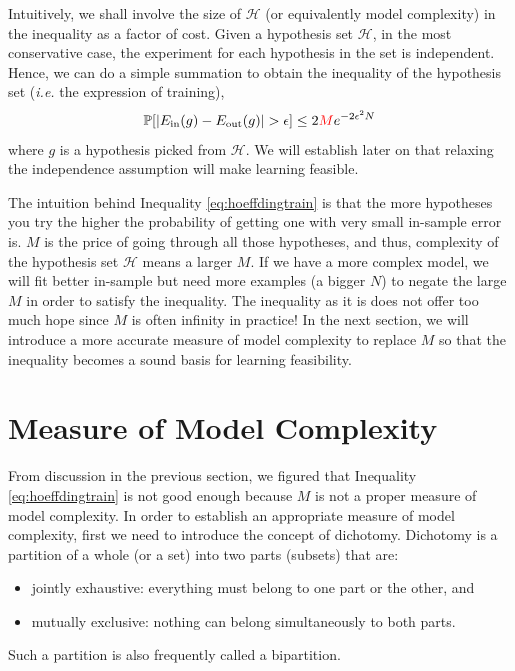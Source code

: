 \documentclass[10pt]{article}
\numberwithin{equation}{section}  %
\begin{document}
Intuitively, we shall involve the size of $\mathcal{H}$ (or equivalently model complexity) in the inequality as a factor of cost. Given a hypothesis set $\mathcal{H}$, in the most conservative case, the experiment for each hypothesis in the set is independent. Hence, we can do a simple summation to obtain the inequality of the hypothesis set (\textit{i.e.} the expression of training),
\begin{equation}\label{eq:hoeffdingtrain}
    \mathbb{P}[\vert E_\mathrm{in}(g)-E_\mathrm{out}(g)\vert > \epsilon] \leq 2\textcolor{red}{M}e^{-2\epsilon^2N}
\end{equation}
where $g$ is a hypothesis picked from $\mathcal{H}$. We will establish later on that relaxing the independence assumption will make learning feasible.

The intuition behind Inequality \eqref{eq:hoeffdingtrain} is that the more hypotheses you try the higher the probability of getting one with very small in-sample error is. $M$ is the price of going through all those hypotheses, and thus, complexity of the hypothesis set $\mathcal{H}$ means a larger $M$. If we have a more complex model, we will fit better in-sample but need more examples (a bigger $N$) to negate the large $M$ in order to satisfy the inequality. The inequality as it is does not offer too much hope since $M$ is often infinity in practice! In the next section, we will introduce a more accurate measure of model complexity to replace $M$ so that the inequality becomes a sound basis for learning feasibility.


\section{Measure of Model Complexity}

From discussion in the previous section, we figured that Inequality \eqref{eq:hoeffdingtrain} is not good enough because $M$ is not a proper measure of model complexity. In order to establish an appropriate measure of model complexity, first we need to introduce the concept of dichotomy. Dichotomy is a partition of a whole (or a set) into two parts (subsets) that are:
\begin{itemize}
    \item jointly exhaustive: everything must belong to one part or the other, and
    \item mutually exclusive: nothing can belong simultaneously to both parts.
\end{itemize}
Such a partition is also frequently called a bipartition.
\end{document}

